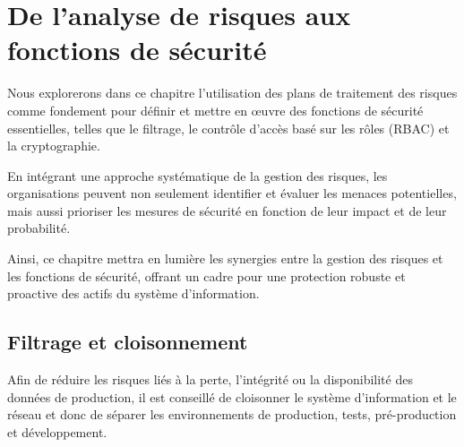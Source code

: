 \section{De l’analyse de risques aux fonctions de sécurité}

Nous explorerons dans ce chapitre l'utilisation des plans de traitement des risques comme fondement pour définir et mettre en œuvre des fonctions de sécurité essentielles, telles que le filtrage, le contrôle d'accès basé sur les rôles (RBAC) et la cryptographie.

En intégrant une approche systématique de la gestion des risques, les organisations peuvent non seulement identifier et évaluer les menaces potentielles, mais aussi prioriser les mesures de sécurité en fonction de leur impact et de leur probabilité.

Ainsi, ce chapitre mettra en lumière les synergies entre la gestion des risques et les fonctions de sécurité, offrant un cadre pour une protection robuste et proactive des actifs du système d'information.

\subsection{Filtrage et cloisonnement}

Afin de réduire les risques liés à la perte, l'intégrité ou la disponibilité des données de production, il est conseillé de cloisonner le système d'information et le réseau et donc de séparer les environnements de production, tests, pré-production et développement.

